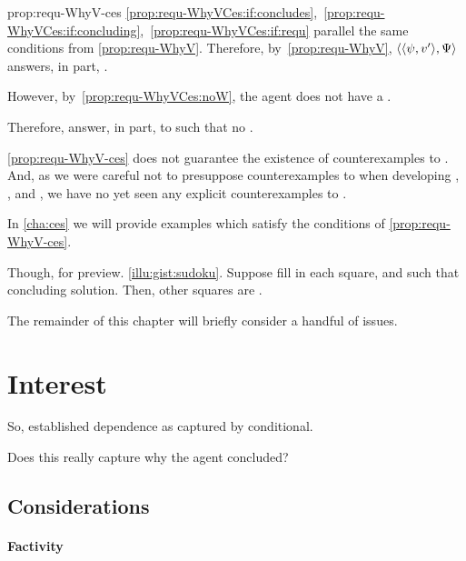 \begin{note}
  \begin{argument}{prop:requ-WhyV-ces}
    \ref{prop:requ-WhyVCes:if:concludes},~\ref{prop:requ-WhyVCes:if:concluding},~\ref{prop:requ-WhyVCes:if:requ} parallel the same conditions from \autoref{prop:requ-WhyV}.
    Therefore, by~\autoref{prop:requ-WhyV}, \(\langle \langle \psi, v' \rangle, \Psi \rangle\) answers, in part, \qWhyV{}.

    However, by~\ref{prop:requ-WhyVCes:noW}, the agent does not have a \wit{}.

    Therefore, answer, in part, to \qWhyV{} such that no \wit{}.
  \end{argument}

  \autoref{prop:requ-WhyV-ces} does not guarantee the existence of counterexamples to \issueConstraint{}.
  And, as we were careful not to presuppose counterexamples to \issueConstraint{} when developing , , and , we have no yet seen any explicit counterexamples to \issueConstraint{}.

  In \autoref{cha:ces} we will provide examples which satisfy the conditions of \autoref{prop:requ-WhyV-ces}.
\end{note}

\begin{note}
  Though, for preview.
  \autoref{illu:gist:sudoku}.
  Suppose fill in each square, and such that concluding solution.
  Then, other squares are .
\end{note}


\begin{note}
  The remainder of this chapter will briefly consider a handful of issues.
\end{note}


\section{Interest}
\label{sec:interest}

\begin{note}
  So, established dependence as captured by conditional.

  Does this really capture why the agent concluded?
\end{note}


\subsection{Considerations}
\label{sec:objection}


\paragraph{Factivity}


